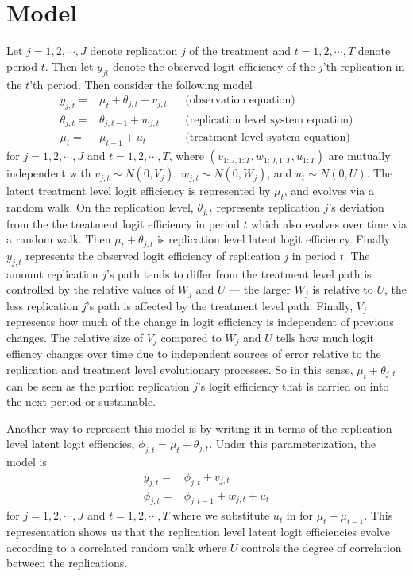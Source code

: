 \documentclass[graybox]{svmult}
\begin{document}
\section{Model}\label{sec:model}
Let $j=1,2,\cdots,J$ denote replication $j$ of the treatment and $t=1,2,\cdots,T$ denote period $t$. Then let $y_{jt}$ denote the observed logit efficiency of the $j$'th replication in the $t$'th period. Then consider the following model
\begin{align}
y_{j,t} =& \mu_t + \theta_{j,t} + v_{j,t}&&\mbox{(observation equation)} \nonumber\\
\theta_{j,t}=&\theta_{j,t-1} + w_{j,t}&&\mbox{(replication level system equation)}\nonumber\\
\mu_t=&\mu_{t-1} + u_t&&\mbox{(treatment level system equation)}\label{eq:hier}
\end{align}
for $j=1,2,\cdots,J$ and $t=1,2,\cdots,T$, where $(v_{1:J,1:T},w_{1:J,1:T},u_{1:T})$ are mutually independent with $v_{j,t}\sim N(0,V_j)$, $w_{j,t}\sim N(0,W_j)$, and $u_t\sim N(0,U)$. The latent treatment level logit efficiency is represented by $\mu_{t}$, and evolves via a random walk. On the replication level, $\theta_{j,t}$ represents replication $j$'s deviation from the the treatment logit efficiency in period $t$ which also evolves over time via a random walk. Then $\mu_t + \theta_{j,t}$ is replication level latent logit efficiency. Finally $y_{j,t}$ represents the observed logit efficiency of replication $j$ in period $t$. The amount replication $j$'s path tends to differ from the treatment level path is controlled by the relative values of $W_j$ and $U$ --- the larger $W_j$ is relative to $U$, the less replication $j$'s path is affected by the treatment level path. Finally, $V_j$ represents how much of the change in logit efficiency is independent of previous changes. The relative size of $V_{j}$ compared to $W_j$ and $U$ tells how much logit effiency changes over time due to independent sources of error relative to the replication and treatment level evolutionary processes. So in this sense, $\mu_t + \theta_{j,t}$ can be seen as the portion replication $j$'s logit efficiency that is carried on into the next period or sustainable.

Another way to represent this model is by writing it in terms of the replication level latent logit effiencies, $\phi_{j,t}=\mu_t + \theta_{j,t}$. Under this parameterization, the model is
\begin{align}
y_{j,t} =& \phi_{j,t} + v_{j,t}\nonumber\\
\phi_{j,t}=&\phi_{j,t-1} + w_{j,t} + u_t \label{eq:notrt}
\end{align}
for $j=1,2,\cdots,J$ and $t=1,2,\cdots,T$ where we substitute $u_t$ in for $\mu_t - \mu_{t-1}$. This representation shows us that the replication level latent logit efficiencies evolve according to a correlated random walk where $U$ controls the degree of correlation between the replications. 
\end{document}
